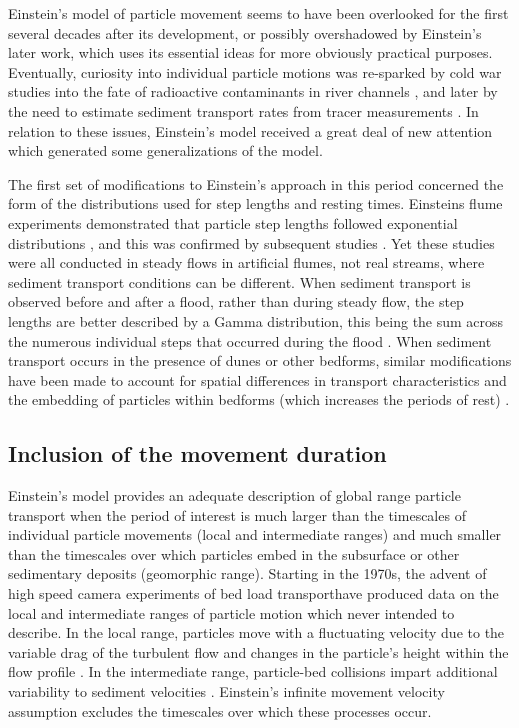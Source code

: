Einstein's model of particle movement seems to have been overlooked for the first several decades after its development, or possibly overshadowed by Einstein's later work, which uses its essential ideas for more obviously practical purposes.
Eventually, curiosity into individual particle motions was re-sparked by cold war studies into the fate of radioactive contaminants in river channels \citep{Crickmore1962, Hubbell1964, Sayre1965,Yang1971}, and later by the need to estimate sediment transport rates from tracer measurements \citep{Yano1969, Todorovic1975, Nakagawa1976, Nakagawa1980, Hassan1991}. In relation to these issues, Einstein's model received a great deal of new attention which generated some generalizations of the model.

The first set of modifications to Einstein's approach in this period concerned the form of the distributions used for step lengths and resting times. Einsteins flume experiments demonstrated that particle step lengths followed exponential distributions \citep{1937}, and this was confirmed by subsequent studies \citep{Yano1969, Nakagawa1976}. Yet these studies were all conducted in steady flows in artificial flumes, not real streams, where sediment transport conditions can be different. When sediment transport is observed before and after a flood, rather than during steady flow, the step lengths are better described by a Gamma distribution, this being the sum across the numerous individual steps that occurred during the flood \citep{Hassan1991}. When sediment transport occurs in the presence of dunes or other bedforms, similar modifications have been made to account for spatial differences in transport characteristics \citep{Crickmore1962, Hubbell1964, Sayre1965} and the embedding of particles within bedforms (which increases the periods of rest) \citep{Yang1971,Nakagawa1980}.

\subsection{Inclusion of the movement duration}
\label{sec:lisle}

Einstein's model provides an adequate description of global range particle transport when the period of interest is much larger than the timescales of individual particle movements (local and intermediate ranges) and much smaller than the timescales over which particles embed in the subsurface or other sedimentary deposits (geomorphic range).
Starting in the 1970s, the advent of high speed camera experiments of bed load transporthave produced data on the local and intermediate ranges of particle motion \citep{Abbott1970,Francis1972,Drake1988} which \citet{Einstein1937} never intended to describe.
In the local range, particles move with a fluctuating velocity due to the variable drag of the turbulent flow \citep{Lajeunesse2010,Fathel2015} and changes in the particle's height within the flow profile \citep{VanRijn1984,Wiberg1985}. In the intermediate range, particle-bed collisions impart additional variability to sediment velocities \citep{Gordon1972,Martin2013}.
Einstein's infinite movement velocity assumption excludes the timescales over which these processes occur.

